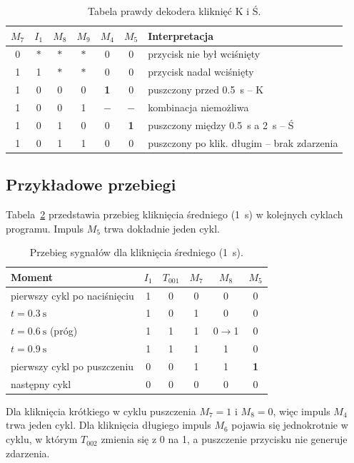 \begin{table}[H]
\centering
\caption{Tabela prawdy dekodera kliknięć K i Ś.}
\label{tab:dekoder}
\begin{tabular}{cccc|cc|l}
\toprule
$M_7$ & $I_1$ & $M_8$ & $M_9$ & $M_4$ & $M_5$ & Interpretacja \\
\midrule
0 & $\ast$ & $\ast$ & $\ast$ & 0 & 0 & przycisk nie był wciśnięty \\
1 & 1 & $\ast$ & $\ast$ & 0 & 0 & przycisk nadal wciśnięty \\
1 & 0 & 0 & 0 & \textbf{1} & 0 & puszczony przed \SI{0,5}{\second} -- K \\
1 & 0 & 0 & 1 & $-$ & $-$ & kombinacja niemożliwa \\
1 & 0 & 1 & 0 & 0 & \textbf{1} & puszczony między \SI{0,5}{\second} a \SI{2}{\second} -- Ś \\
1 & 0 & 1 & 1 & 0 & 0 & puszczony po klik. długim -- brak zdarzenia \\
\bottomrule
\end{tabular}
\end{table}

\subsection{Przykładowe przebiegi}
Tabela~\ref{tab:przebieg} przedstawia przebieg kliknięcia średniego
(\SI{1}{\second}) w kolejnych cyklach programu. Impuls $M_5$ trwa
dokładnie jeden cykl.

\begin{table}[H]
\centering
\caption{Przebieg sygnałów dla kliknięcia średniego (\SI{1}{\second}).}
\label{tab:przebieg}
\begin{tabular}{l|ccccc}
\toprule
Moment & $I_1$ & $T_{001}$ & $M_7$ & $M_8$ & $M_5$ \\
\midrule
pierwszy cykl po naciśnięciu    & 1 & 0 & 0 & 0 & 0 \\
$t = \SI{0,3}{\second}$         & 1 & 0 & 1 & 0 & 0 \\
$t = \SI{0,6}{\second}$ (próg)  & 1 & 1 & 1 & 0$\to$1 & 0 \\
$t = \SI{0,9}{\second}$         & 1 & 1 & 1 & 1 & 0 \\
pierwszy cykl po puszczeniu     & 0 & 0 & 1 & 1 & \textbf{1} \\
następny cykl                   & 0 & 0 & 0 & 0 & 0 \\
\bottomrule
\end{tabular}
\end{table}

Dla kliknięcia krótkiego w cyklu puszczenia $M_7=1$ i $M_8=0$, więc
impuls $M_4$ trwa jeden cykl. Dla kliknięcia długiego impuls $M_6$
pojawia się jednokrotnie w cyklu, w którym $T_{002}$ zmienia się
z 0 na 1, a puszczenie przycisku nie generuje zdarzenia.
